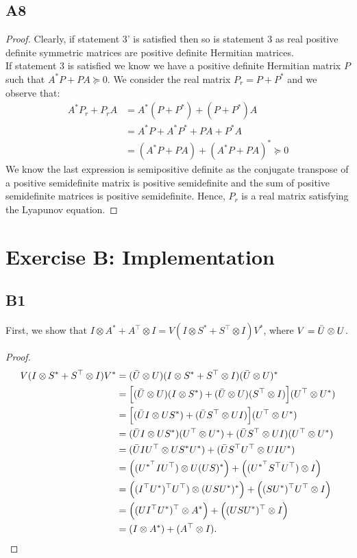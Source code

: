 \documentclass[11pt]{article}
\newcommand{\kp}{\otimes}
\begin{document}
\subsection*{A8}
\begin{proof}\leavevmode
Clearly, if statement 3' is satisfied then so is statement 3 as real positive definite symmetric matrices are positive definite Hermitian matrices.\\
If statement 3 is satisfied we know we have a positive definite Hermitian matrix $P$ such that $A^*P+PA\succeq 0$. We consider the real matrix $P_r=P+P^*$ and we observe that:
\begin{align*}
    A^* P_r+P_r A &= A^*(P+P^*)+(P+P^*)A\\
    &= A^*P+A^*P^*+PA+P^*A\\
    &= (A^*P+PA)+(A^*P+PA)^* \succeq 0
\end{align*}
We know the last expression is semipositive definite as the conjugate transpose of a positive semidefinite matrix is positive semidefinite and the sum of positive semidefinite matrices is positive semidefinite. Hence, $P_r$ is a real matrix satisfying the Lyapunov equation.
\end{proof}

\section*{Exercise B: Implementation}
\subsection*{B1}
First, we show that $I \kp A^{*} + A^\top \kp I = V (I \kp S^{*} + S^\top \kp I) V^{*}$, where \(V = \Bar{U} \kp U\).

\begin{proof}
\begin{align*}
   V (I \kp S^{*} + S^\top \kp I) V^{*}
   &= (\Bar{U} \kp U) (I \kp S^{*} + S^\top \kp I) (\Bar{U} \kp U)^{*} \\
   &= \Big[(\Bar{U} \kp U) (I \kp S^{*}) + (\Bar{U} \kp U) (S^\top \kp I)\Big] (U^\top \kp U^{*}) \\
   &= \Big[(\Bar{U} I \kp U S^{*}) + (\Bar{U}S^\top \kp U I)\Big] (U^\top \kp U^{*}) \\
   &= (\Bar{U} I \kp U S^{*}) (U^\top \kp U^{*}) + (\Bar{U}S^\top \kp U I) (U^\top \kp U^{*}) \\
   &= (\Bar{U} I U^\top \kp U S^{*} U^{*}) + (\Bar{U}S^\top U^\top \kp U I U^{*}) \\
   &= \Big((U^{*^\top} I U^\top)\kp U (U S)^{*} \Big) + \Big((U^{*^\top} S^\top U^\top) \kp I \Big) \\
   &= \Big((I^\top U^{*})^\top U^\top) \kp (U S U^{*})^{*} \Big) + \Big((S U^{*})^\top U^\top \kp I \Big) \\
   &= \Big((U I^\top U^{*})^\top \kp A^{*} \Big) + \Big((U S U^{*})^\top \kp I \Big)\\
   &= (I \kp A^{*} ) + (A^\top \kp I).\qedhere
\end{align*}
\end{proof}
\end{document}
